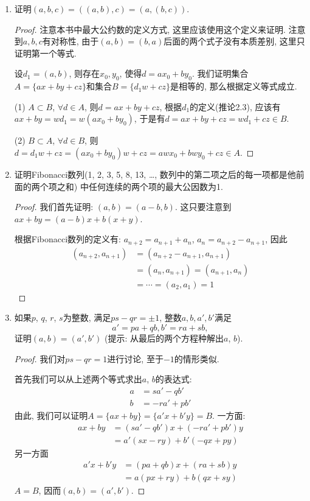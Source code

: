 \documentclass[12pt,a4paper]{book} %
\theoremstyle{remark}
\theoremstyle{example}
\theoremstyle{lemma}
\theoremstyle{corollary}
\numberwithin{theorem}{chapter}
\begin{document}
\begin{enumerate}
\item \label{exercise:II_1} 证明$(a, b, c) = ((a, b), c) = (a, (b, c))$.
\begin{proof}
注意本书中最大公约数的定义方式, 这里应该使用这个定义来证明. 注意到$a,b,c$有对称性, 由于$(a, b) = (b, a)$后面的两个式子没有本质差别, 这里只证明第一个等式.

设$d_1 = (a, b)$, 则存在$x_0, y_0$, 使得$d = ax_0 + by_0$. 我们证明集合$A = \{ax + by + cz\}$和集合$B = \{d_1w + cz\}$是相等的, 那么根据定义等式成立.

(1) $A \subset B$, $\forall d \in A$, 则$d = ax + by + cz$, 根据$d_1$的定义(推论2.3), 应该有$ax + by = wd_1 = w(ax_0 + by_0)$, 于是有$d = ax + by + cz = wd_1 + cz \in B$.

(2) $B \subset A$, $\forall d \in B$, 则$d = d_1w + cz = (ax_0 + by_0)w + cz = awx_0 + bwy_0 + cz \in A$.
\end{proof}

\item \label{exercise:II_2} 证明Fibonacci数列(1, 2, 3, 5, 8, 13, \ldots, 数列中的第二项之后的每一项都是他前面的两个项之和) 中任何连续的两个项的最大公因数为1.

\begin{proof}
我们首先证明: $(a, b) = (a- b, b)$. 这只要注意到$ax + by = (a-b)x + b(x + y)$.

根据Fibonacci数列的定义有: $a_{n+2} = a_{n+1} + a_n$, $a_n = a_{n+2} - a_{n+1}$, 因此
\[
\begin{aligned}
(a_{n+2}, a_{n+1}) &= (a_{n+2} - a_{n+1}, a_{n+1})\\ 
&= (a_n, a_{n+1}) = (a_{n+1}, a_n) \\
&= \cdots = (a_2, a_1) = 1
\end{aligned}
\]

\end{proof}

\item \label{exercise:II_3} 如果$p$, $q$, $r$, $s$为整数, 满足$ps - qr = \pm 1$, 整数$a, b, a', b'$满足
\[
a' = pa + qb, b' = ra + sb,
\]
证明$(a, b) = (a', b')$ (提示: 从最后的两个方程种解出$a$, $b$).

\begin{proof}
我们对$ps - qr = 1$进行讨论, 至于$-1$的情形类似.

首先我们可以从上述两个等式求出$a$, $b$的表达式:
\[
\begin{aligned}
a &= sa' - qb'\\
b &= -ra' + pb'
\end{aligned}
\]
由此, 我们可以证明$A = \{ax + by\} = \{a'x + b'y\} = B$. 一方面:
\[
\begin{aligned}
ax + by &= (sa' - qb')x + (-ra' + pb')y \\
&= a'(sx-ry) + b'(-qx + py)
\end{aligned}
\]
另一方面
\[
\begin{aligned}
a'x + b'y &= (pa + qb)x + (ra + sb)y \\
&= a(px+ry) + b(qx + sy)
\end{aligned}
\]
$A = B$, 因而$(a, b) = (a', b')$.
\end{proof}


\end{enumerate}
\end{document}
